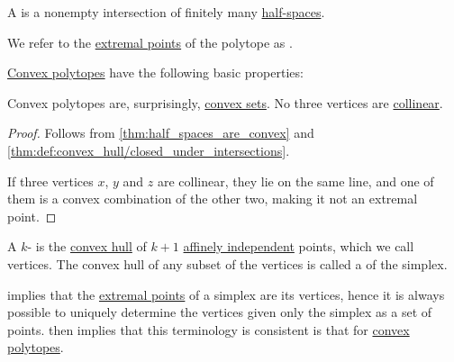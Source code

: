 \begin{definition}\label{def:convex_polytope}\mimprovised
  A  is a nonempty intersection of finitely many \hyperref[def:half_space]{half-spaces}.

  We refer to the \hyperref[def:extremal_point]{extremal points} of the polytope as .
\end{definition}

\begin{definition}\label{def:degenerate_polytope}\mimprovised
\end{definition}

\begin{proposition}\label{thm:def:convex_polytope}
  \hyperref[def:convex_polytope]{Convex polytopes} have the following basic properties:
  \begin{thmenum}
     Convex polytopes are, surprisingly, \hyperref[def:convex_hull]{convex sets}.
     No three vertices are \hyperref[def:collinear_points]{collinear}.
  \end{thmenum}
\end{proposition}
\begin{proof}
   Follows from \cref{thm:half_spaces_are_convex} and \cref{thm:def:convex_hull/closed_under_intersections}.

   If three vertices \( x \), \( y \) and \( z \) are collinear, they lie on the same line, and one of them is a convex combination of the other two, making it not an extremal point.
\end{proof}

\begin{definition}\label{def:simplex}\mimprovised
  A \( k \)- is the \hyperref[def:convex_hull]{convex hull} of \( k + 1 \) \hyperref[def:affine_dependence]{affinely independent} points, which we call vertices. The convex hull of any subset of the vertices is called a  of the simplex.

   implies that the \hyperref[def:extremal_point]{extremal points} of a simplex are its vertices, hence it is always possible to uniquely determine the vertices given only the simplex as a set of points.  then implies that this terminology is consistent is that for \hyperref[def:convex_polytope]{convex polytopes}.
\end{definition}

